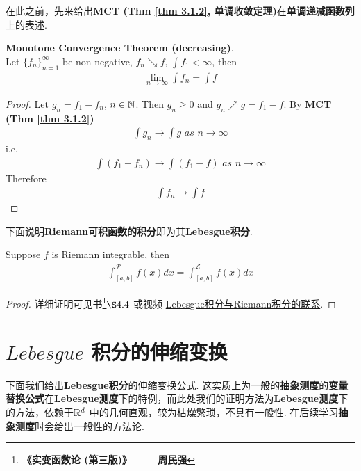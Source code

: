 	\vspace{2em}
	在此之前，先来给出\textbf{MCT (Thm \ref{thm 3.1.2}, 单调收敛定理)}在\textbf{单调递减函数列}上的表述.
	\begin{thm}\label{thm 3.6.1}
		\textbf{Monotone Convergence Theorem (decreasing)}. \\
		Let $\{ f_n \}_{n = 1}^{\infty}$ be non-negative, $f_n \searrow f$, $\int{f_1} < \infty$, then
		\begin{align}
			\lim_{n \to \infty}{\int{f_n}} = \int{f}
		\end{align}
	
		\vspace{2em}
		\begin{proof}
			Let $g_n = f_1 - f_n$, $n \in \mathbb{N}$. Then $g_n \geq 0$ and $g_n \nearrow g = f_1 - f$. By \textbf{MCT (Thm \ref{thm 3.1.2})}
			\begin{align}
				\int{g_n} \to \int{g} \,\, as \,\, n \to \infty
			\end{align}
			i.e.
			\begin{align}
				\int{(f_1 - f_n)} \to \int{(f_1 - f)} \,\, as \,\, n \to \infty
			\end{align}
			Therefore
			\begin{align}
				\int{f_n} \to \int{f}
			\end{align}
		\end{proof}
	\end{thm}

	\vspace{3em}
	下面说明\textbf{Riemann可积函数的积分}即为其\textbf{Lebesgue积分}.
	\begin{thm}\label{thm 3.6.2}
		Suppose $f$ is Riemann integrable, then
		\begin{align}
			\int_{[a , b]}^{\mathcal{R}}{f(x) dx} = \int_{[a , b]}^{\mathcal{L}}{f(x) dx}
		\end{align}
	
		\vspace{3em}
		\begin{proof}
			详细证明可见书\footnote{\textbf{《实变函数论 (第三版)》—— 周民强}}$\S 4.4$ 或视频 \href{https://www.bilibili.com/video/BV1FT411C7wM?p=28}{Lebesgue积分与Riemann积分的联系}.
		\end{proof}
	\end{thm}

\newpage
\section{$Lebesgue$ 积分的伸缩变换}
	下面我们给出\textbf{Lebesgue积分}的伸缩变换公式. 这实质上为一般的\textbf{抽象测度}的\textbf{变量替换公式}在\textbf{Lebesgue测度}下的特例，而此处我们的证明方法为\textbf{Lebesgue测度}下的方法，依赖于$\mathbb{R}^d$ 中的几何直观，较为枯燥繁琐，不具有一般性. 在后续学习\textbf{抽象测度}时会给出一般性的方法论.
	
